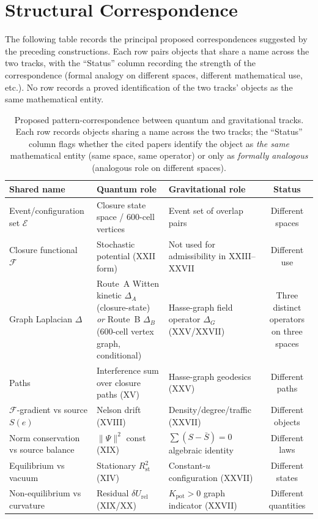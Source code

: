 \documentclass[12pt]{article}
\newcommand{\Ecal}{\mathcal{E}}
\newcommand{\Fcal}{\mathcal{F}}
\newcommand{\Rst}{R_{\mathrm{st}}}
\begin{document}
\section{Structural Correspondence}\label{sec:correspondence}

The following table records the principal proposed correspondences suggested by the preceding constructions. Each row pairs objects that share a name across the two tracks, with the ``Status'' column recording the strength of the correspondence (formal analogy on different spaces, different mathematical use, etc.). No row records a proved identification of the two tracks' objects as the same mathematical entity.

\begin{table}[ht]
\centering
\caption{Proposed pattern-correspondence between quantum and gravitational tracks. Each row records objects sharing a name across the two tracks; the ``Status'' column flags whether the cited papers identify the object as \emph{the same} mathematical entity (same space, same operator) or only as \emph{formally analogous} (analogous role on different spaces).}
\label{tab:correspondence}
\begin{tabular}{@{}lllc@{}}
\toprule
Shared name & Quantum role & Gravitational role & Status \\
\midrule
Event/configuration set $\Ecal$ & Closure state space / 600-cell vertices & Event set of overlap pairs & Different spaces \\
Closure functional $\Fcal$ & Stochastic potential (XXII form) & Not used for admissibility in XXIII--XXVII & Different use \\
Graph Laplacian $\Delta$ & Route~A Witten kinetic $\Delta_A$ (closure-state) \emph{or} Route~B $\Delta_B$ (600-cell vertex graph, conditional) & Hasse-graph field operator $\Delta_G$ (XXV/XXVII) & Three distinct operators on three spaces \\
Paths & Interference sum over closure paths (XV) & Hasse-graph geodesics (XXV) & Different paths \\
$\Fcal$-gradient vs source $S(e)$ & Nelson drift (XVIII) & Density/degree/traffic (XXVII) & Different objects \\
Norm conservation vs source balance & $\|\Psi\|^2$ const (XIX) & $\sum(S - \bar S) = 0$ algebraic identity & Different laws \\
Equilibrium vs vacuum & Stationary $\Rst^2$ (XIV) & Constant-$u$ configuration (XXVII) & Different states \\
Non-equilibrium vs curvature & Residual $\delta U_{\mathrm{rel}}$ (XIX/XX) & $K_{\mathrm{pot}} > 0$ graph indicator (XXVII) & Different quantities \\
\bottomrule
\end{tabular}
\end{table}
\end{document}
